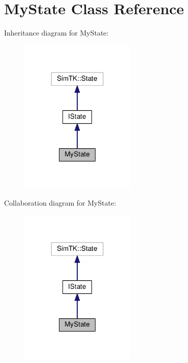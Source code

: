 \hypertarget{classMyState}{}\section{My\+State Class Reference}
\label{classMyState}


Inheritance diagram for My\+State\+:\nopagebreak
\begin{figure}[H]
\begin{center}
\leavevmode
\includegraphics[width=156pt]{classMyState__inherit__graph}
\end{center}
\end{figure}


Collaboration diagram for My\+State\+:\nopagebreak
\begin{figure}[H]
\begin{center}
\leavevmode
\includegraphics[width=156pt]{classMyState__coll__graph}
\end{center}
\end{figure}
